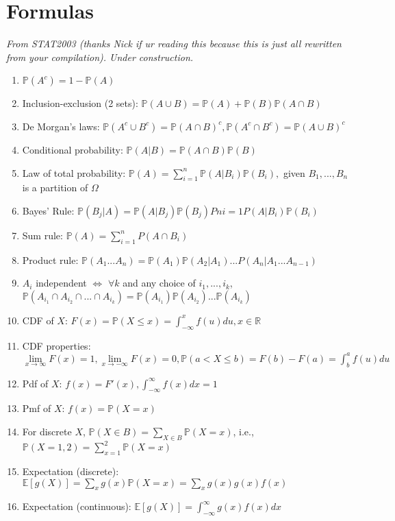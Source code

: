 \chapter{Formulas}

\textit{From STAT2003 (thanks Nick if ur reading this because this is just all rewritten from your compilation). Under construction.}

\begin{enumerate}
    \item \(\mathbb{P}(A^c)=1-\mathbb{P}(A)\)
    \item Inclusion-exclusion (2 sets): \(\mathbb{P}(A\cup B)=\mathbb{P}(A)+\mathbb{P}(B)\mathbb{P}(A\cap B)\)
    \item De Morgan’s laws: \(\mathbb{P}(A^c\cup B^c)=\mathbb{P}(A\cap B)^c, \mathbb{P}(A^c\cap B^c)=\mathbb{P}(A\cup B)^c\)
    \item Conditional probability: \(\mathbb{P}(A|B)=\mathbb{P}(A\cap B)\mathbb{P}(B)\)
    \item Law of total probability: \(\mathbb{P}(A)=\sum_{i=1}^n \mathbb{P}(A|B_i)\mathbb{P}(B_i),\) given \(B_1,...,B_n\) is a partition of \(\Omega\)
    \item Bayes’ Rule: \(\mathbb{P}(B_j|A)=\mathbb{P}(A|B_j)\mathbb{P}(B_j)Pni=1P(A|B_i)\mathbb{P}(B_i)\)
    \item Sum rule: \(\mathbb{P}(A)=\sum_{i=1}^n P(A\cap B_i)\)
    \item Product rule: \(\mathbb{P}(A_1... A_n)=\mathbb{P}(A_1)\mathbb{P}(A_2|A_1)...P(A_n|A_1...A_{n-1})\)
    \item \(A_i\) independent \(\iff\) \(\forall k\) and any choice of \(i_1,...,i_k\), \(\mathbb{P}(A_{i_1} \cap A_{i_2} \cap... \cap A_{i_k})=\mathbb{P}(A_{i_1})\mathbb{P}(A_{i_2})...\mathbb{P}(A_{i_k})\)
    \item CDF of \(X\): \(F(x)=\mathbb{P}(X\leq x)=\int_{-\infty}^{x} f(u)du, x\in \mathbb{R}\)
    \item CDF properties: \(\underset{x\to\infty}{\lim} F(x)=1, \underset{x\to-\infty}{\lim} F(x)=0, \mathbb{P}(a<X\leq b)=F(b)- F(a) = \int_b^a f(u)du\)
    \item Pdf of \(X\): \(f(x)=F'(x), \int_{-\infty}^{\infty} f(x)dx=1\)
    \item Pmf of \(X\): \(f(x)=\mathbb{P}(X=x)\)
    \item For discrete \(X\), \(\mathbb{P}(X\in B)= \sum_{X\in B} \mathbb{P}(X=x)\), i.e., \(\mathbb{P}(X={1,2})=\sum_{x=1}^2 \mathbb{P}(X=x)\)
    \item Expectation (discrete): \(\mathbb{E}[g(X)] =\sum_x g(x)\mathbb{P}(X=x)=\sum_x g(x) g(x)f(x)\)
    \item Expectation (continuous): \(\mathbb{E}[g(X)] = \int_{-\infty}^{\infty} g(x)f(x)dx\)
\end{enumerate}


